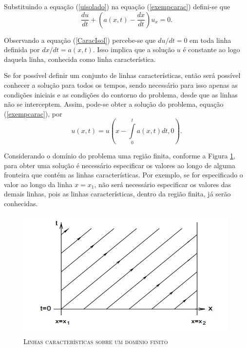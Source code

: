 Substituindo a equação (\ref{uisolado}) na equação (\ref{exempcarac}) defini-se que
\begin{equation} \label{CaracIsol}
\frac{du}{dt} + \left( a(x,t) -\frac{dx}{dt} \right)u_x = 0.
\end{equation}

Observando a equação (\ref{CaracIsol}) percebe-se que ${du}/{dt} = 0$ em toda linha definida por ${dx}/{dt} = a(x,t)$. Isso implica que a solução $u$ é constante ao logo daquela linha, conhecida como linha característica.

Se for possível definir um conjunto de linhas características, então será possível conhecer a solução para todos os tempos, sendo necessário para isso apenas as condições iniciais e as condições do contorno do problema, desde que as linhas não se interceptem. Assim, pode-se obter a solução do problema, equação (\ref{exempcarac}), por
\begin{equation}
u(x,t) = u \left( x - \int\limits_{0}^{t} a(x,t) dt , 0 \right).
\end{equation}  

Considerando o domínio do problema uma região finita, conforme a Figura \ref{fig:dominiofinito}, para obter uma solução é necessário especificar os valores ao longo de alguma fronteira que contém as linhas características. Por exemplo, se for especificado o valor ao longo da linha $x=x_1$, não será necessário especificar os valores das demais linhas, pois as linhas características, dentro da região finita, já serão conhecidas.

\begin{figure}[H]
\centering
\includegraphics[scale=1.2]{figuras/Caracteristica.jpg}
\caption{\textsc{Linhas características sobre um domínio finito}}
\vspace{-0.1cm}
\label{fig:dominiofinito}
\end{figure}


